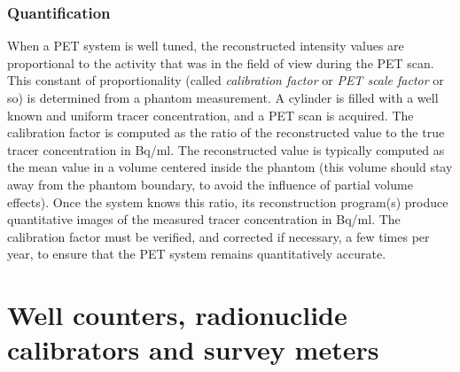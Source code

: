 \documentclass[11pt,oneside]{book}
\begin{document}
\subsection{Quantification} \label{sec:scalefactor}
When a PET system is well tuned, the reconstructed intensity values
are proportional to the activity that was in the field of view during
the PET scan. This constant of proportionality (called {\em
calibration factor} or {\em PET scale factor} or so) is determined
from a phantom measurement. A cylinder is filled with a well known and
uniform tracer concentration, and a PET scan is acquired. The
calibration factor is computed as the ratio of the reconstructed value
to the true tracer concentration in Bq/ml.  The reconstructed value is
typically computed as the mean value in a volume centered inside the
phantom (this volume should stay away from the phantom boundary, to
avoid the influence of partial volume effects). Once the system knows
this ratio, its reconstruction program(s) produce quantitative images
of the measured tracer concentration in Bq/ml. The calibration factor
must be verified, and corrected if necessary, a few times per year, to
ensure that the PET system remains quantitatively accurate.


\chapter[Well counters, radionuclide calibrators, survey meters]
        {Well counters, radionuclide calibrators and survey meters}
\end{document}
